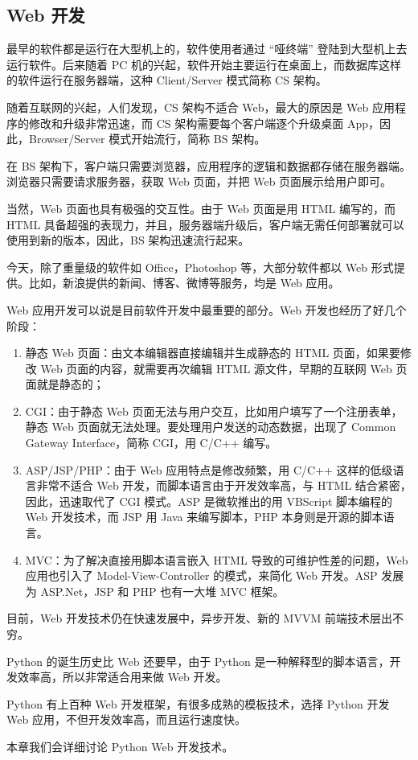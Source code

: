 \hypertarget{web-ux5f00ux53d1}{%
\subsection{Web 开发}\label{web-ux5f00ux53d1}}

最早的软件都是运行在大型机上的，软件使用者通过 ``哑终端''
登陆到大型机上去运行软件。后来随着 PC
机的兴起，软件开始主要运行在桌面上，而数据库这样的软件运行在服务器端，这种
Client/Server 模式简称 CS 架构。

随着互联网的兴起，人们发现，CS 架构不适合 Web，最大的原因是 Web
应用程序的修改和升级非常迅速，而 CS 架构需要每个客户端逐个升级桌面
App，因此，Browser/Server 模式开始流行，简称 BS 架构。

在 BS
架构下，客户端只需要浏览器，应用程序的逻辑和数据都存储在服务器端。浏览器只需要请求服务器，获取
Web 页面，并把 Web 页面展示给用户即可。

当然，Web 页面也具有极强的交互性。由于 Web 页面是用 HTML 编写的，而 HTML
具备超强的表现力，并且，服务器端升级后，客户端无需任何部署就可以使用到新的版本，因此，BS
架构迅速流行起来。

今天，除了重量级的软件如 Office，Photoshop 等，大部分软件都以 Web
形式提供。比如，新浪提供的新闻、博客、微博等服务，均是 Web 应用。

Web 应用开发可以说是目前软件开发中最重要的部分。Web
开发也经历了好几个阶段：

\begin{enumerate}
\def\labelenumi{\arabic{enumi}.}
\item
  静态 Web 页面：由文本编辑器直接编辑并生成静态的 HTML 页面，如果要修改
  Web 页面的内容，就需要再次编辑 HTML 源文件，早期的互联网 Web
  页面就是静态的；
\item
  CGI：由于静态 Web 页面无法与用户交互，比如用户填写了一个注册表单，静态
  Web 页面就无法处理。要处理用户发送的动态数据，出现了 Common Gateway
  Interface，简称 CGI，用 C/C++ 编写。
\item
  ASP/JSP/PHP：由于 Web 应用特点是修改频繁，用 C/C++
  这样的低级语言非常不适合 Web 开发，而脚本语言由于开发效率高，与 HTML
  结合紧密，因此，迅速取代了 CGI 模式。ASP 是微软推出的用 VBScript
  脚本编程的 Web 开发技术，而 JSP 用 Java 来编写脚本，PHP
  本身则是开源的脚本语言。
\item
  MVC：为了解决直接用脚本语言嵌入 HTML 导致的可维护性差的问题，Web
  应用也引入了 Model-View-Controller 的模式，来简化 Web 开发。ASP 发展为
  ASP.Net，JSP 和 PHP 也有一大堆 MVC 框架。
\end{enumerate}

目前，Web 开发技术仍在快速发展中，异步开发、新的 MVVM 前端技术层出不穷。

Python 的诞生历史比 Web 还要早，由于 Python
是一种解释型的脚本语言，开发效率高，所以非常适合用来做 Web 开发。

Python 有上百种 Web 开发框架，有很多成熟的模板技术，选择 Python 开发 Web
应用，不但开发效率高，而且运行速度快。

本章我们会详细讨论 Python Web 开发技术。

